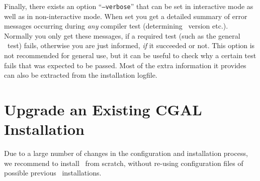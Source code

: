 Finally, there exists an option
``\texttt{--verbose}'' that
can be set in interactive mode as well as in non-interactive mode.
When set you get a detailed summary of error messages occurring during
\textit{any} compiler test (determining \stl\ version etc.). Normally
you only get these messages, if a required test (such as the general
\stl\ test) fails, otherwise you are just informed, \textit{if} it
succeeded or not. This option is not recommended for general use, but
it can be useful to check why a certain test fails that was expected
to be passed. Most of the extra information it provides can also be
extracted from the installation logfile.

\section{Upgrade an Existing CGAL Installation\label{sec:upgrade}}

Due to a large number of changes in the configuration and installation
process, we recommend to install \cgal\ from scratch, without re-using
configuration files of possible previous \cgal\ installations.




